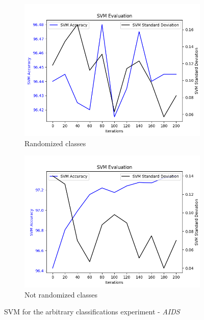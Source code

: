 		\begin{figure}[H]
			\centering
			\begin{subfigure}{0.49\textwidth}
				\centering
				\includegraphics[width=1.1\linewidth]{images/plotE4_SVM_E_GDL_09_16h-32m}
				\caption{Randomized classes}
				\label{fig:fig:plote4svmegdl0916h-32m}
			\end{subfigure}
			\begin{subfigure}{0.49\textwidth}
				\centering
				\includegraphics[width=1.1\linewidth]{images/plotE4_SVM_E_GDL_09_17h-17m}
				\caption{Not randomized classes}
				\label{fig:plote4svmegdl0917h-17m}
			\end{subfigure}
			\caption{SVM for the arbitrary classifications experiment - \textit{AIDS}}
			\label{fig:ArbitraryClSVM}
		\end{figure}
		
